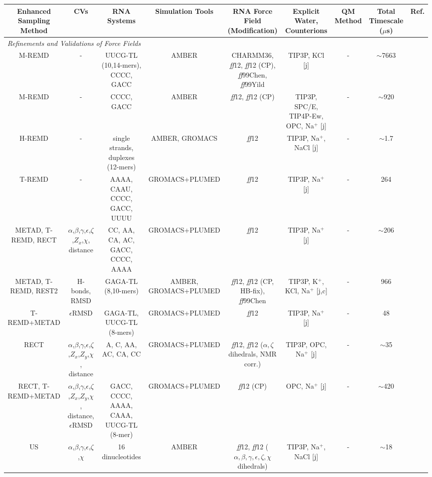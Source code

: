 \begin{tabular}{ccccccccc}
\toprule 
Enhanced Sampling Method  & CVs & RNA Systems & Simulation Tools & RNA Force Field (Modification) & Explicit Water, Counterions & QM Method & Total Timescale ($\mu$s) & Ref.\tabularnewline
\midrule
\midrule 
\multicolumn{9}{l}{\emph{Refinements and Validations of Force Fields}}\tabularnewline
\midrule 
M-REMD & - & UUCG-TL (10,14-mers), CCCC, GACC & AMBER & CHARMM36, \emph{ff}12, \emph{ff}12 (CP), \emph{ff}99Chen, \emph{ff}99Yild & TIP3P, KCl {[}j{]} & - & $\sim$7663 & \cite{bergonzo2015highly}\tabularnewline
\midrule 
M-REMD & - & CCCC, GACC & AMBER & \emph{ff}12, \emph{ff}12 (CP) & TIP3P, SPC/E, TIP4P-Ew, OPC, Na$^{+}$ {[}j{]} & - & $\sim$920 & \cite{bergonzo2015improved}\tabularnewline
\midrule 
H-REMD & - & single strands, duplexes (12-mers) & AMBER, GROMACS & \emph{ff}12 & TIP3P, Na$^{+}$, NaCl {[}j{]} & - & $\sim$1.7 & \cite{sakuraba2015predicting}\tabularnewline
\midrule 
T-REMD & - & AAAA, CAAU, CCCC, GACC, UUUU & GROMACS+PLUMED & \emph{ff}12 & TIP3P, Na$^{+}$ {[}j{]} & - & 264 & \cite{bottaro2016rna}\tabularnewline
\midrule 
METAD, T-REMD, RECT & $\alpha$,$\beta$,$\gamma$,$\epsilon$,$\zeta$,$Z_{x}$,$\chi$, distance & CC, AA, CA, AC, GACC, CCCC, AAAA & GROMACS+PLUMED & \emph{ff}12 & TIP3P, Na$^{+}$ {[}j{]} & - & $\sim$206 & \cite{gil2016empirical}\tabularnewline
\midrule 
METAD, T-REMD, REST2 & H-bonds, RMSD  & GAGA-TL (8,10-mers) & AMBER, GROMACS+PLUMED & \emph{ff}12, \emph{ff}12 (CP, HB-fix), \emph{ff}99Chen & TIP3P, K$^{+}$, KCl, Na$^{+}$ {[}j,c{]} & - & 966 & \cite{Kuhrova2016}\tabularnewline
\midrule 
T-REMD+METAD & $\epsilon$RMSD & GAGA-TL, UUCG-TL (8-mers) & GROMACS+PLUMED & \emph{ff}12 & TIP3P, Na$^{+}$ {[}j{]} & - & 48 & \cite{bottaro2016free}\tabularnewline
\midrule 
RECT & $\alpha$,$\beta$,$\gamma$,$\epsilon$,$\zeta$,$Z_{x}$,$Z_{y}$,$\chi$, distance & A, C, AA, AC, CA, CC & GROMACS+PLUMED & \emph{ff}12, \emph{ff}12 ($\alpha,\zeta$ dihedrals, NMR corr.) & TIP3P, OPC, Na$^{+}$ {[}j{]} & - & $\sim$35 & \cite{cesari2016maxent}\tabularnewline
\midrule 
RECT, T-REMD+METAD & $\alpha$,$\beta$,$\gamma$,$\epsilon$,$\zeta$,$Z_{x}$,$Z_{y}$,$\chi$, distance, $\epsilon$RMSD & GACC, CCCC, AAAA, CAAA, UUCG-TL (8-mer)  & GROMACS+PLUMED & \emph{ff}12 (CP) & OPC, Na$^{+}$ {[}j{]} & - & $\sim$420 & \cite{yang2016predicting}\tabularnewline
\midrule 
US & $\alpha$,$\beta$,$\gamma$,$\epsilon$,$\zeta$,$\chi$ & 16 dinucleotides & AMBER & \emph{ff}12, \emph{ff}12 ($\alpha,\beta,\gamma,\epsilon,\zeta,\chi$ dihedrals) & TIP3P, Na$^{+}$, NaCl {[}j{]} & - & $\sim$18 & \cite{aytenfisu2017revised}\tabularnewline

\end{tabular}
